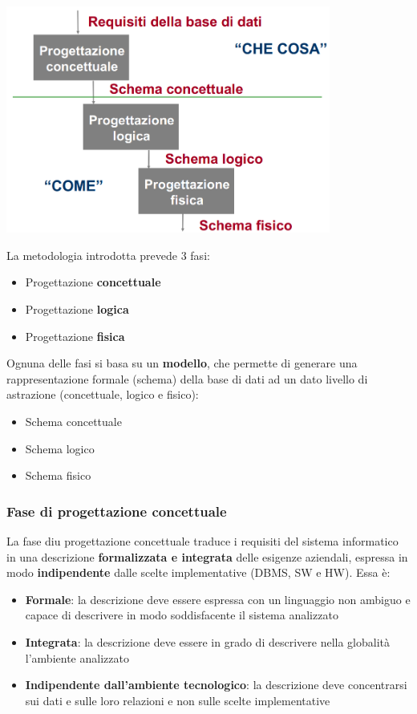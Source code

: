 \documentclass[12pt]{article}
\begin{document}
\begin{center}
    \includegraphics[width = 0.80\textwidth]{Images/13.PNG}
\end{center}
La metodologia introdotta prevede 3 fasi:
\begin{itemize}
    \item Progettazione \textbf{concettuale}
    \item Progettazione \textbf{logica}
    \item Progettazione \textbf{fisica}
\end{itemize}
Ognuna delle fasi si basa su un \textbf{modello}, che permette di generare una rappresentazione formale (schema) della base di dati ad un dato livello di astrazione (concettuale, logico e fisico):
\begin{itemize}
    \item Schema concettuale
    \item Schema logico
    \item Schema fisico
\end{itemize}
\subsubsection{Fase di progettazione concettuale}
La fase diu progettazione concettuale traduce i requisiti del sistema informatico in una descrizione \textbf{formalizzata e integrata} delle esigenze aziendali, espressa in modo \textbf{indipendente} dalle scelte implementative (DBMS, SW e HW).
Essa è:
\begin{itemize}
    \item \textbf{Formale}: la descrizione deve essere espressa con un linguaggio non ambiguo e capace di descrivere in modo soddisfacente il sistema analizzato
    \item \textbf{Integrata}: la descrizione deve essere in grado di descrivere nella globalità l'ambiente analizzato
    \item \textbf{Indipendente dall'ambiente tecnologico}: la descrizione deve concentrarsi sui dati e sulle loro relazioni e non sulle scelte implementative
\end{itemize}
\end{document}

